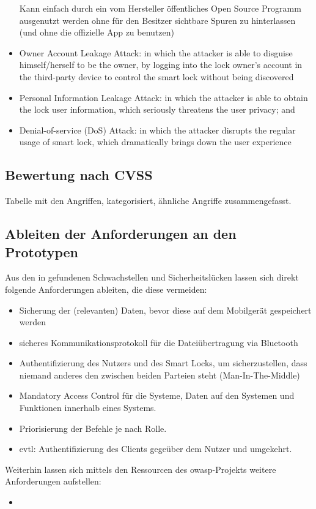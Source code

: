 \begin{itemize}
		    Kann einfach durch ein vom Hersteller öffentliches Open Source Programm ausgenutzt werden ohne für den Besitzer sichtbare Spuren zu hinterlassen (und ohne die offizielle App zu benutzen)
		\item Owner Account Leakage Attack: in which the attacker is able to disguise himself/herself to be the owner, by logging into the lock owner’s account in the third-party device to control the smart lock without being discovered
		\item Personal Information Leakage Attack: in which the attacker is able to obtain the lock user information, which seriously threatens the user privacy; and
		\item Denial-of-service (DoS) Attack: in which the attacker disrupts the regular usage of smart lock, which dramatically	brings down the user experience
	\end{itemize}

\subsection{Bewertung nach CVSS}
\label{sec:analysis_cvss}
	Tabelle mit den Angriffen, kategorisiert, ähnliche Angriffe zusammengefasst.
	
	
\subsection{Ableiten der Anforderungen an den Prototypen}
\label{sec:analysis_requirements}
    Aus den in  gefundenen Schwachstellen und Sicherheitslücken lassen sich direkt folgende Anforderungen ableiten, die diese vermeiden:
    \begin{itemize}
        \item Sicherung der (relevanten) Daten, bevor diese auf dem Mobilgerät gespeichert werden\cite{Ye2017}
        \item sicheres Kommunikationsprotokoll für die Dateiübertragung via Bluetooth\cite{Ye2017}
        \item Authentifizierung des Nutzers und des Smart Locks, um sicherzustellen, dass niemand anderes den zwischen beiden Parteien steht (Man-In-The-Middle)\cite{Ye2017}
        \item Mandatory Access Control für die Systeme, Daten auf den Systemen und Funktionen innerhalb eines Systems.\cite{Ye2017}
        \item Priorisierung der Befehle\cite{Ye2017} je nach Rolle.
        \item evtl: Authentifizierung des Clients gegeüber dem Nutzer und umgekehrt.
    \end{itemize}
	
	Weiterhin lassen sich mittels den Ressourcen des \gls{owasp}-Projekts\cite{Miessler2015}\cite{Miessler2015a} weitere Anforderungen aufstellen:
	\begin{itemize}
	    \item 
	\end{itemize}